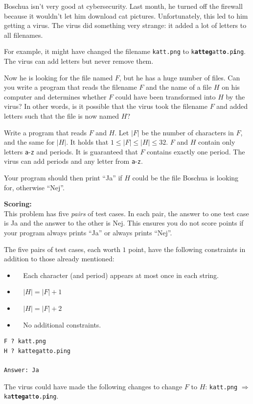 Boschua isn't very good at cybersecurity. Last month, he turned off the firewall
because it wouldn't let him download cat pictures. Unfortunately, this led to him getting a virus.  
The virus did something very strange: it added a lot of letters to all filenames.  

For example, it might have changed the filename \texttt{katt.png} to \texttt{k\textbf{atteg}att\textbf{o}.p\textbf{i}ng}.  
The virus can add letters but never remove them.  

Now he is looking for the file named $F$, but he has a huge number of files. Can you write a
program that reads the filename $F$ and the name of a file $H$ on his computer and determines
whether $F$ could have been transformed into $H$ by the virus?  
In other words, is it possible that the virus took the filename $F$ and added letters such that the file is now named $H$?  

Write a program that reads $F$ and $H$. Let $|F|$ be the number of characters in $F$, and the same for $|H|$.  
It holds that $1 \leq |F| \leq |H| \leq 32$. $F$ and $H$ contain only letters \texttt{a}-\texttt{z} and periods.  
It is guaranteed that $F$ contains exactly one period. The virus can add periods and any letter from \texttt{a}-\texttt{z}.  

Your program should then print ``Ja'' if $H$ could be the file Boschua is looking for, otherwise ``Nej''.  

\vspace{0.5cm}  
\textbf{Scoring:}\\  
This problem has five \textit{pairs} of test cases. In each pair, the answer to one test case is Ja and
the answer to the other is Nej.  
This ensures you do not score points if your program always prints ``Ja'' or always prints ``Nej''.  

The five pairs of test cases, each worth $1$ point, have the following constraints in addition to those already mentioned:  
\begin{itemize}  
    \item[(Pair 1)] $\;\;\;\;$Each character (and period) appears at most once in each string.  
    \item[(Pair 2)] $\;\;\;\;|H| = |F|+1$  
    \item[(Pair 3)] $\;\;\;\;|H| = |F|+2$  
    \item[(Pairs 4-5)] $\;\;\;\;$No additional constraints.  
\end{itemize} 

\vspace{0.5cm}
\begin{verbatim}
F ? katt.png
H ? kattegatto.ping

Answer: Ja
\end{verbatim}
 The virus could have made the following changes to change $F$ to $H$:
\texttt{katt.png} $\Rightarrow$ \texttt{ka\textbf{ttega}tt\textbf{o}.p\textbf{i}ng}.

